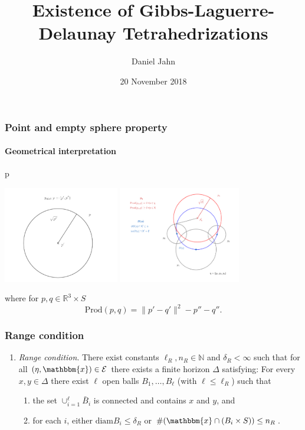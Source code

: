 \documentclass[c, 10pt]{beamer}
\title[Existence of Gibbs-Laguerre-Delaunay Tetrahedrizations]{%
       Existence of Gibbs-Laguerre-Delaunay Tetrahedrizations}
\author[jahn@karlin.mff.cuni.cz]{%
        Daniel Jahn}
\institute[KPMS]{%
           Department of Probability and Mathematical Statistics}
\date[20.11.2018]{%
      20 November 2018}
\newcommand{\x}{{\mathbbm{x}}}
\begin{document}

\frame[plain]{\titlepage}


\begin{frame}\frametitle{Point and empty sphere property}\framesubtitle{Geometrical interpretation}p


\begin{centering}\includegraphics[height = 4.2cm]{./FigureLayout/point.PNG}
\includegraphics[height = 4.2cm]{./FigureLayout/power.PNG}\end{centering}
\vspace{3mm}

where for $p,q \in \mathbb R^3 \times S$
$$\text{Prod}(p,q) = \|p'-q'\|^2 - p'' - q''.$$

\end{frame}






\begin{frame}\frametitle{Range condition}
\begin{enumerate}[\textbf{(R)}]
	\item \textit{Range condition}. There exist constants $\ell_R,n_R \in \mathbb N$ and $\delta_R < \infty$ such that for all $(\eta,\x) \in \mathcal E$ there exists a finite horizon $\Delta$ satisfying: For every $x,y \in \Delta$ there exist $\ell$ open balls $B_1, \dots, B_\ell$ (with $\ell \leq \ell_R$) such that
	\begin{enumerate}[-]
		\item the set $\cup^\ell_{i=1} \bar B_i$ is connected and contains $x$ and $y$, and 
		\item for each $i$, either $\text{diam} B_i \leq \delta_R$ or $\# (\x \cap (B_i\times S)) \leq n_R$.
	\end{enumerate}
\end{enumerate}
\end{frame}
\end{document}
